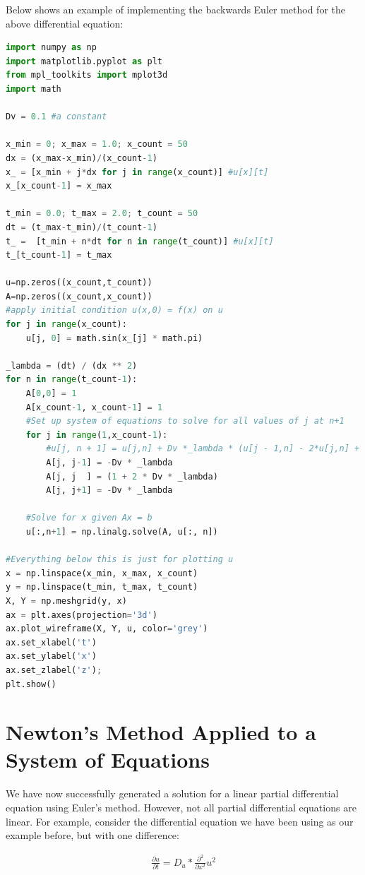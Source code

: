 \documentclass[11pt]{article}
\begin{document}
Below shows an example of implementing the backwards Euler method for the above differential equation:

\begin{lstlisting}[language=Python]
import numpy as np
import matplotlib.pyplot as plt
from mpl_toolkits import mplot3d
import math

Dv = 0.1 #a constant

x_min = 0; x_max = 1.0; x_count = 50
dx = (x_max-x_min)/(x_count-1)
x_ = [x_min + j*dx for j in range(x_count)] #u[x][t]
x_[x_count-1] = x_max

t_min = 0.0; t_max = 2.0; t_count = 50
dt = (t_max-t_min)/(t_count-1)
t_ =  [t_min + n*dt for n in range(t_count)] #u[x][t]
t_[t_count-1] = t_max

u=np.zeros((x_count,t_count))
A=np.zeros((x_count,x_count))
#apply initial condition u(x,0) = f(x) on u
for j in range(x_count):
    u[j, 0] = math.sin(x_[j] * math.pi)

_lambda = (dt) / (dx ** 2)
for n in range(t_count-1):
    A[0,0] = 1
    A[x_count-1, x_count-1] = 1
    #Set up system of equations to solve for all values of j at n+1
    for j in range(1,x_count-1):
        #u[j, n + 1] = u[j,n] + Dv *_lambda * (u[j - 1,n] - 2*u[j,n] + u[j + 1,n]) #explicit solution
        A[j, j-1] = -Dv * _lambda
        A[j, j  ] = (1 + 2 * Dv * _lambda)
        A[j, j+1] = -Dv * _lambda

    #Solve for x given Ax = b
    u[:,n+1] = np.linalg.solve(A, u[:, n])

#Everything below this is just for plotting u
x = np.linspace(x_min, x_max, x_count)
y = np.linspace(t_min, t_max, t_count)
X, Y = np.meshgrid(y, x)
ax = plt.axes(projection='3d')
ax.plot_wireframe(X, Y, u, color='grey')
ax.set_xlabel('t')
ax.set_ylabel('x')
ax.set_zlabel('z');
plt.show()
\end{lstlisting}

\newpage
\section*{Newton's Method Applied to a System of Equations}

We have now successfully generated a solution for a linear partial differential equation using Euler's method. However, not all partial differential equations are linear. For example, consider the differential equation we have been using as our example before, but with one difference: 

\begin{align*}
    \frac{\partial u}{\partial t} = D_u * \frac{\partial^{2}}{\partial x^{2}}u^2
\end{align*}
\end{document}
